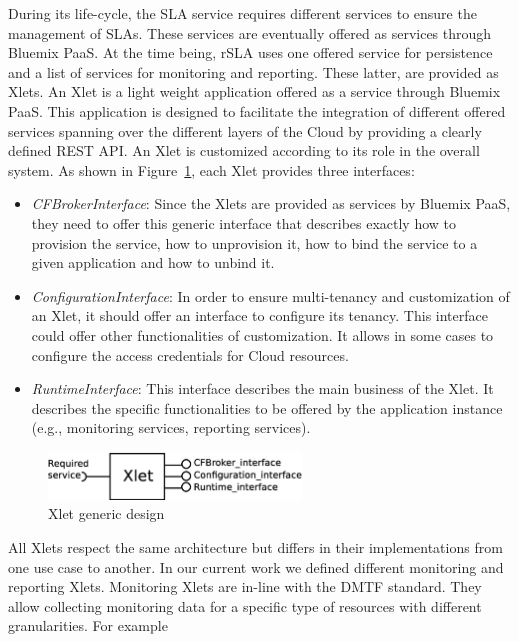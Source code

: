 During its life-cycle, the SLA service requires different services to ensure the management of 
SLAs. These services are eventually offered as services through Bluemix PaaS. At the time being, 
rSLA uses one offered service for persistence and a list of services for monitoring and reporting. 
These latter, are provided as Xlets. An Xlet is a light weight application offered as a service 
through Bluemix PaaS. This application is designed to facilitate the integration of different 
offered services spanning over the different layers of the Cloud by providing a clearly defined REST 
API. An Xlet is customized according to its role in the overall system. As shown in 
Figure~\ref{fig:xlet}, each Xlet provides three interfaces:
\begin{itemize}
 \item \emph{CFBrokerInterface}: Since the Xlets are provided as services by Bluemix PaaS, they need 
to offer this generic interface that describes exactly how to provision the service, how to 
unprovision it, how to bind the service to a given application and how to unbind it.
 \item  \emph{ConfigurationInterface}: In order to ensure multi-tenancy and customization of an 
Xlet, it should offer an interface to configure its tenancy. This interface could offer other 
functionalities of customization. It allows in some cases to configure the access credentials for 
Cloud resources.
 \item  \emph{RuntimeInterface}: This interface describes the main business of the Xlet. It 
describes the specific functionalities to be offered by the application instance (e.g., monitoring 
services, reporting services). 
\end{itemize}
\begin{figure}[H]
\centering
\includegraphics[width=0.6\textwidth]{pics/Xlet}
\caption{\label{fig:xlet} Xlet generic design}
\end{figure}

All Xlets respect the same architecture but differs in their implementations from one use case to 
another. In our current work we defined different monitoring and reporting Xlets. Monitoring Xlets 
are in-line with the DMTF standard. They allow collecting monitoring data for a specific type of 
resources with different granularities. For example

